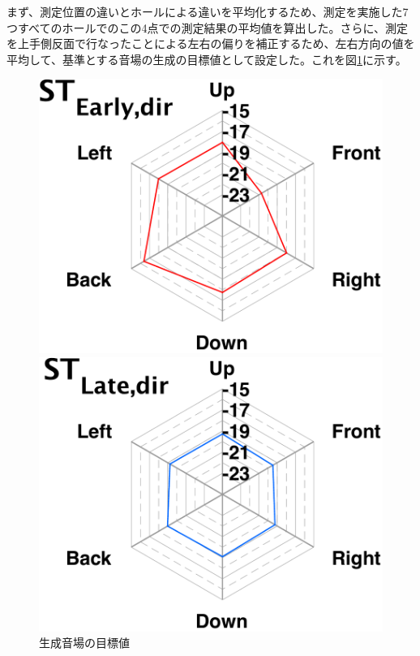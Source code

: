 \documentclass[11pt,a4j]{jreport}
\begin{document}
まず、測定位置の違いとホールによる違いを平均化するため、測定を実施した7つすべてのホールでのこの4点での測定結果の平均値を算出した。さらに、測定を上手側反面で行なったことによる左右の偏りを補正するため、左右方向の値を平均して、基準とする音場の生成の目標値として設定した。これを図\ref{fig:生成音場の目標値}に示す。


\begin{figure}[H]
  \begin{minipage}[b]{.5\textwidth}
    \centering
    \includegraphics[width=.8\linewidth]{images/realHallDirSt/targetField/early.pdf}
  \end{minipage}%
  \begin{minipage}[b]{.5\textwidth}
    \centering
    \includegraphics[width=.8\linewidth]{images/realHallDirSt/targetField/late.pdf}
  \end{minipage}

  \caption{生成音場の目標値}
  \label{fig:生成音場の目標値}
\end{figure}





\end{document}
